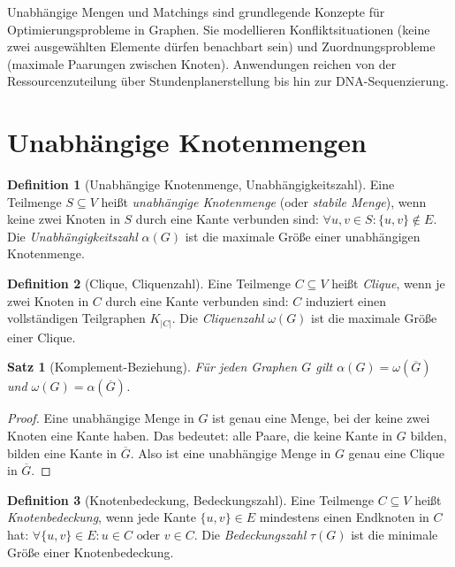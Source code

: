 ﻿\documentclass[a4paper,12pt,openany,oneside]{book}
\theoremstyle{definition}
\newtheorem{definition}{Definition}[chapter]
\theoremstyle{plain}
\newtheorem{satz}{Satz}[chapter]
\theoremstyle{remark}
\begin{document}
Unabh\"angige Mengen und Matchings sind grundlegende Konzepte f\"ur
Optimierungsprobleme in Graphen. Sie modellieren Konfliktsituationen
(keine zwei ausgew\"ahlten Elemente d\"urfen benachbart sein) und
Zuordnungsprobleme (maximale Paarungen zwischen Knoten). Anwendungen
reichen von der Ressourcenzuteilung \"uber Stundenplanerstellung bis hin
zur DNA-Sequenzierung.

\section{Unabh\"angige Knotenmengen}

\begin{definition}[Unabh\"angige Knotenmenge, Unabh\"angigkeitszahl]
  Eine Teilmenge $S \subseteq V$ hei\ss{}t \emph{unabh\"angige Knotenmenge}
  (oder \emph{stabile Menge}), wenn keine zwei Knoten in $S$ durch eine
  Kante verbunden sind:
  $\forall u, v \in S: \{u,v\} \notin E.$
  Die \emph{Unabh\"angigkeitszahl} $\alpha(G)$ ist die maximale Gr\"o\ss{}e
  einer unabh\"angigen Knotenmenge.
\end{definition}

\begin{definition}[Clique, Cliquenzahl]
  Eine Teilmenge $C \subseteq V$ hei\ss{}t \emph{Clique}, wenn je zwei
  Knoten in $C$ durch eine Kante verbunden sind: $C$ induziert einen
  vollst\"andigen Teilgraphen $K_{|C|}$. Die \emph{Cliquenzahl} $\omega(G)$
  ist die maximale Gr\"o\ss{}e einer Clique.
\end{definition}

\begin{satz}[Komplement-Beziehung]
  F\"ur jeden Graphen $G$ gilt $\alpha(G) = \omega(\overline{G})$ und
  $\omega(G) = \alpha(\overline{G})$.
\end{satz}

\begin{proof}
  Eine unabh\"angige Menge in $G$ ist genau eine Menge, bei der keine zwei
  Knoten eine Kante haben. Das bedeutet: alle Paare, die keine Kante in $G$
  bilden, bilden eine Kante in $\overline{G}$. Also ist eine unabh\"angige
  Menge in $G$ genau eine Clique in $\overline{G}$.
\end{proof}

\begin{definition}[Knotenbedeckung, Bedeckungszahl]
  Eine Teilmenge $C \subseteq V$ hei\ss{}t \emph{Knotenbedeckung}, wenn
  jede Kante $\{u,v\} \in E$ mindestens einen Endknoten in $C$ hat:
  $\forall \{u,v\} \in E: u \in C \text{ oder } v \in C.$
  Die \emph{Bedeckungszahl} $\tau(G)$ ist die minimale Gr\"o\ss{}e einer
  Knotenbedeckung.
\end{definition}
\end{document}
